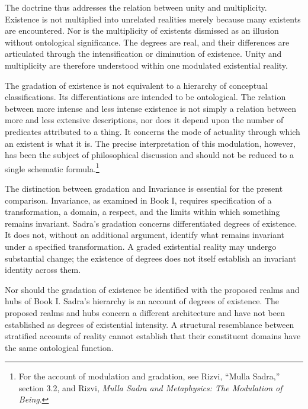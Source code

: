 The doctrine thus addresses the
relation between unity and
multiplicity. Existence is not
multiplied into unrelated realities
merely because many existents
are encountered. Nor is the
multiplicity of existents dismissed
as an illusion without ontological
significance. The degrees are
real, and their differences
are articulated through the
intensification or diminution
of existence. Unity and multiplicity
are therefore understood within
one modulated existential reality.

\label{para:VS.B01.P01.C08.S17.SS06.P003}

The gradation of existence is
not equivalent to a hierarchy
of conceptual classifications.
Its differentiations are intended
to be ontological. The relation
between more intense and less
intense existence is not simply
a relation between more and
less extensive descriptions,
nor does it depend upon the
number of predicates attributed
to a thing. It concerns the
mode of actuality through which
an existent is what it is.
The precise interpretation of
this modulation, however, has
been the subject of philosophical
discussion and should not be
reduced to a single schematic
formula.\footnote{For the account
of modulation and gradation,
see Rizvi, ``Mulla Sadra,''
section 3.2, and Rizvi,
\textit{Mulla Sadra and Metaphysics:
The Modulation of Being}.}

\label{para:VS.B01.P01.C08.SS06.P004}

The distinction between gradation
and Invariance is essential
for the present comparison.
Invariance, as examined in
Book I, requires specification
of a transformation, a domain,
a respect, and the limits
within which something remains
invariant. Sadra's gradation
concerns differentiated degrees
of existence. It does not,
without an additional argument,
identify what remains invariant
under a specified transformation.
A graded existential reality
may undergo substantial change;
the existence of degrees does
not itself establish an invariant
identity across them.

\label{para:VS.B01.P01.C08.S17.SS06.P005}

Nor should the gradation of
existence be identified with
the proposed realms and hubs
of Book I. Sadra's hierarchy
is an account of degrees of
existence. The proposed realms
and hubs concern a different
architecture and have not been
established as degrees of
existential intensity. A
structural resemblance between
stratified accounts of reality
cannot establish that their
constituent domains have the
same ontological function.

